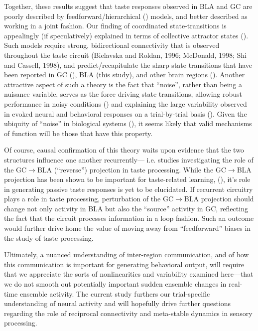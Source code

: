 \begin{refsection}
Together, these results suggest that taste responses observed in BLA and GC are poorly described by feedforward/hierarchical (\cite{parras2017a,glaser2018a,heidari-gorji2021a}) models, and better described as working in a joint fashion. Our finding of coordinated state-transitions is appealingly (if speculatively) explained in terms of collective attractor states (\cite{miller2010a,litwin-kumar2012a,camera2019a,recanatesi2022a}). Such models require strong, bidirectional connectivity that is observed throughout the taste circuit (Bielavska and Roldan, 1996; McDonald, 1998; Shi and Cassell, 1998), and predict/recapitulate the sharp state transitions that have been reported in GC (\cite{jones2007a,sadacca2016a}), BLA (this study), and other brain regions (\cite{seidemann1996a,gat1997a,sugase1999a,latimer2015a}). Another attractive aspect of such a theory is the fact that “noise”, rather than being a nuisance variable, serves as the force driving state transitions, allowing robust performance in noisy conditions (\cite{miller2013a}) and explaining the large variability observed in evoked neural and behavioral responses on a trial-by-trial basis (\cite{kisley1999a,carandini2004a,jones2007a,kotekal2020a,peixoto2021a}). Given the ubiquity of “noise” in biological systems (\cite{shadlen1994a,shadlen1998a,miller2010a}), it seems likely that valid mechanisms of function will be those that have this property. 

Of course, causal confirmation of this theory waits upon evidence that the two structures influence one another recurrently— i.e. studies investigating the role of the GC$\rightarrow$BLA (“reverse”) projection in taste processing. While the GC$\rightarrow$BLA projection has been shown to be important for taste-related learning, (\cite{lavi2018a,kayyal2019a}), it’s role in generating passive taste responses is yet to be elucidated. If recurrent circuitry plays a role in taste processing, perturbation of the GC$\rightarrow$BLA projection should change not only activity in BLA but also the “source” activity in GC, reflecting the fact that the circuit processes information in a loop fashion. Such an outcome would further drive home the value of moving away from “feedforward” biases in the study of taste processing. 

Ultimately, a nuanced understanding of inter-region communication, and of how this communication is important for generating behavioral output, will require that we appreciate the sorts of nonlinearities and variability examined here—that we do not smooth out potentially important sudden ensemble changes in real-time ensemble activity. The current study furthers our trial-specific understanding of neural activity and will hopefully drive further questions regarding the role of reciprocal connectivity and meta-stable dynamics in sensory processing.

\printbibliography[title={References}]

\end{refsection}